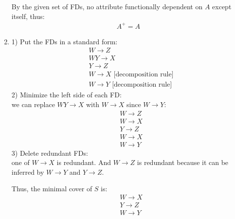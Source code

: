 \documentclass[10pt]{article}
\newcommand{\imply}{\to}
\begin{document}
\begin{enumerate}
  By the given set of FDs, no attribute functionally dependent on $A$
  except itself, thus:
  \begin{align*}
    A^+ = A
  \end{align*}

\item 1) Put the FDs in a standard form:
  \begin{align*}
    &W \imply Z\\
    &WY \imply X\\
    &Y \imply Z\\
    &W \imply X \text{  [decomposition rule]}\\
    &W \imply Y \text{  [decomposition rule]}
  \end{align*}
  2) Minimize the left side of each FD:\\
  we can replace $WY \imply X$ with $W \imply X$ since $W \imply Y$:
  \begin{align*}
    &W \imply Z\\
    &W \imply X\\
    &Y \imply Z\\
    &W \imply X\\
    &W \imply Y
  \end{align*}
  3) Delete redundant FDs:\\
  one of $W \imply X$ is redundant. And $W \imply Z$ is redundant
  because it can be inferred by $W \imply Y$ and $Y \imply Z$.

  Thus, the minimal cover of $S$ is:
  \begin{align*}
    &W \imply X\\
    &Y \imply Z\\
    &W \imply Y
  \end{align*}

\end{enumerate}
\end{document}
